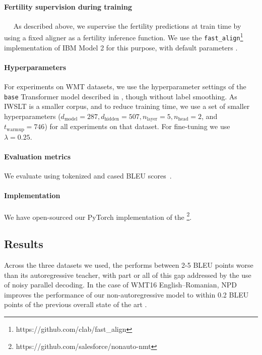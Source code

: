 \documentclass{article} %
\begin{document}
\vspace{-5pt}
\paragraph{Fertility supervision during training}~~
As described above, we supervise the fertility predictions at train time by using a fixed aligner as a fertility inference function. We use the \texttt{fast\_align}\footnote{https://github.com/clab/fast\_align} implementation of IBM Model 2 for this purpose, with default parameters
\citep{dyer2013simple}.

\vspace{-5pt}
\paragraph{Hyperparameters}
For experiments on WMT datasets, we use the hyperparameter settings of the \texttt{base} Transformer model described in \citet{vaswani2017attention}, though without label smoothing. As IWSLT is a smaller corpus, and to reduce training time, we use a set of smaller hyperparameters ($d_{\text{model}}=287, d_{\text{hidden}}=507, n_{\text{layer}}=5, n_{\text{head}}=2$, and $t_\text{warmup}=746$) for all experiments on that dataset.
For fine-tuning we use $\lambda=0.25$.

\vspace{-5pt}
\paragraph{Evaluation metrics} We evaluate using tokenized and cased BLEU scores~\citep{papineni2002bleu}.

\vspace{-5pt}
\paragraph{Implementation} We have open-sourced our PyTorch implementation of the \model{}\footnote{https://github.com/salesforce/nonauto-nmt}.

\subsection{Results}
Across the three datasets we used, the \model{} performs between 2-5 BLEU points worse than its autoregressive teacher, with part or all of this gap addressed by the use of noisy parallel decoding. In the case of WMT16 English--Romanian, NPD improves the performance of our non-autoregressive model to within 0.2 BLEU points of the previous overall state of the art \citep{gehring2017convolutional}.
\end{document}
